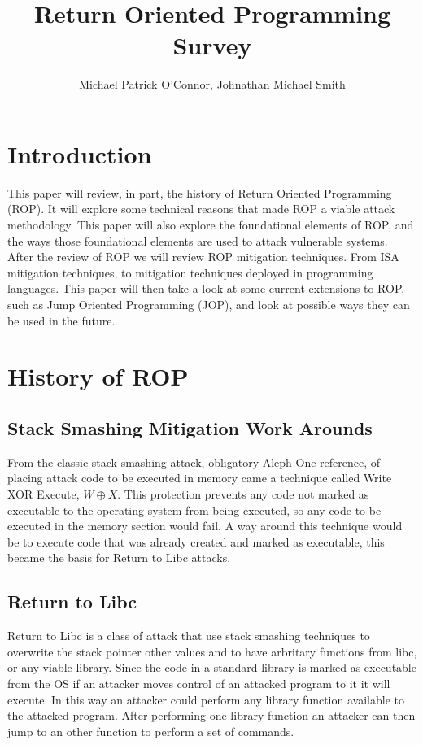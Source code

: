 \documentclass[11pt]{amsart}
\title{Return Oriented Programming Survey}
\author{Michael Patrick O'Connor, Johnathan Michael Smith}
\date{}
\begin{document}
\maketitle

\newpage
\section*{Introduction}
This paper will review, in part, the history of Return Oriented Programming (ROP).  It will explore some technical reasons that made ROP a viable attack methodology. This paper will also explore the foundational elements of ROP, and the ways those foundational elements are used to attack vulnerable systems.  After the review of ROP we will review ROP mitigation techniques.  From ISA mitigation techniques, to mitigation techniques deployed in programming languages. This paper will then take a look at some current extensions to ROP, such as Jump Oriented Programming (JOP), and look at possible ways they can be used in the future.
\section*{History of ROP}
\subsection*{Stack Smashing Mitigation Work Arounds}
From the classic stack smashing attack, obligatory Aleph One reference, of placing attack code to be executed in memory came a technique called Write XOR Execute, $W \oplus X$. This protection prevents any code not marked as executable to the operating system from being executed, so any code to be executed in the memory section would fail. A way around this technique would be to execute code that was already created and marked as executable, this became the basis for Return to Libc attacks.
\subsection*{Return to Libc}
Return to Libc is a class of attack that use stack smashing techniques to overwrite the stack pointer other values and to have arbritary functions from libc, or any viable library. Since the code in a standard library is marked as executable from the OS if an attacker moves control of an attacked program to it it will execute. In this way an attacker could perform any library function available to the attacked program. After performing one library function an attacker can then jump to an other function to perform a set of commands.
\end{document}
